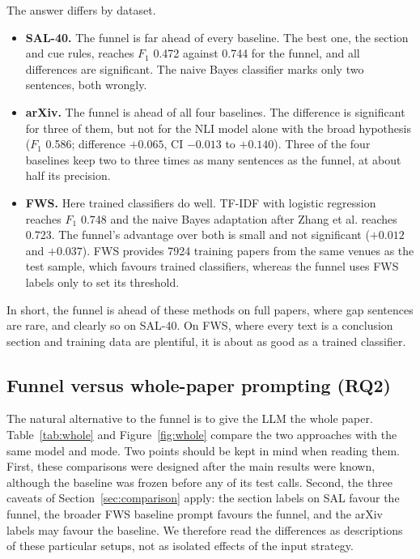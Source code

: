 The answer differs by dataset.
\begin{itemize}
  \item \textbf{SAL-40.} The funnel is far ahead of every baseline. The best one, the section and cue rules, reaches $F_1$ 0.472 against 0.744 for the funnel, and all differences are significant. The naive Bayes classifier marks only two sentences, both wrongly.
  \item \textbf{arXiv.} The funnel is ahead of all four baselines. The difference is significant for three of them, but not for the NLI model alone with the broad hypothesis ($F_1$ 0.586; difference $+0.065$, CI $-0.013$ to $+0.140$). Three of the four baselines keep two to three times as many sentences as the funnel, at about half its precision.
  \item \textbf{FWS.} Here trained classifiers do well. TF-IDF with logistic regression reaches $F_1$ 0.748 and the naive Bayes adaptation after Zhang et al. reaches 0.723. The funnel's advantage over both is small and not significant ($+0.012$ and $+0.037$). FWS provides 7924 training papers from the same venues as the test sample, which favours trained classifiers, whereas the funnel uses FWS labels only to set its threshold.
\end{itemize}
In short, the funnel is ahead of these methods on full papers, where gap sentences are rare, and clearly so on SAL-40. On FWS, where every text is a conclusion section and training data are plentiful, it is about as good as a trained classifier.

\subsection{Funnel versus whole-paper prompting (RQ2)}
\label{sec:rq3}

The natural alternative to the funnel is to give the LLM the whole paper. Table~\ref{tab:whole} and Figure~\ref{fig:whole} compare the two approaches with the same model and mode. Two points should be kept in mind when reading them. First, these comparisons were designed after the main results were known, although the baseline was frozen before any of its test calls. Second, the three caveats of Section~\ref{sec:comparison} apply: the section labels on SAL favour the funnel, the broader FWS baseline prompt favours the funnel, and the arXiv labels may favour the baseline. We therefore read the differences as descriptions of these particular setups, not as isolated effects of the input strategy.

